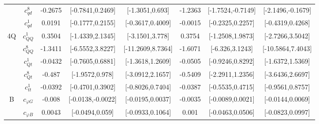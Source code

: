 \documentclass{article}
\begin{document}
\begin{table}[H]
\begin{tabular}{|c|c|c|c|c|c|c|c|}
 & $c_{qd}^{8}$ & -0.2675                             & [-0.7841,0.2469]                                 & [-1.3051,0.693] & -1.2363                             & [-1.7524,-0.7149]                                 & [-2.1496,-0.1679] \\ \cline{2-8}
 & $c_{qd}^{1}$ & 0.0191                             & [-0.1777,0.2155]                                 & [-0.3617,0.4009] & -0.0015                             & [-0.2325,0.2257]                                 & [-0.4319,0.4268] \\ \cline{2-8}
\hline
\multirow{5}{*}{4Q}
 & $c_{QQ}^{1}$ & 0.3504                             & [-1.4339,2.1345]                                 & [-3.1501,3.778] & 0.3754                             & [-1.2508,1.9873]                                 & [-2.7266,3.5042] \\ \cline{2-8}
 & $c_{QQ}^{8}$ & -1.3411                             & [-6.5552,3.8227]                                 & [-11.2609,8.7364] & -1.6071                             & [-6.326,3.1243]                                 & [-10.5864,7.4043] \\ \cline{2-8}
 & $c_{Qt}^{1}$ & -0.0432                             & [-0.7605,0.6881]                                 & [-1.3618,1.2609] & -0.0505                             & [-0.9246,0.8292]                                 & [-1.6372,1.5369] \\ \cline{2-8}
 & $c_{Qt}^{8}$ & -0.487                             & [-1.9572,0.978]                                 & [-3.0912,2.1657] & -0.5409                             & [-2.2911,1.2356]                                 & [-3.6436,2.6697] \\ \cline{2-8}
 & $c_{tt}^{1}$ & -0.0392                             & [-0.4701,0.3902]                                 & [-0.8026,0.7404] & -0.0387                             & [-0.5535,0.4715]                                 & [-0.9561,0.8757] \\ \cline{2-8}
\hline
\multirow{7}{*}{B}
 & $c_{\varphi G}$ & -0.008                             & [-0.0138,-0.0022]                                 & [-0.0195,0.0037] & -0.0035                             & [-0.0089,0.0021]                                 & [-0.0144,0.0069] \\ \cline{2-8}
 & $c_{\varphi B}$ & 0.0043                             & [-0.0494,0.059]                                 & [-0.0933,0.1064] & 0.001                             & [-0.0463,0.0506]                                 & [-0.0823,0.0997] \\ \cline{2-8}

\end{tabular}
\end{table}
\end{document}
